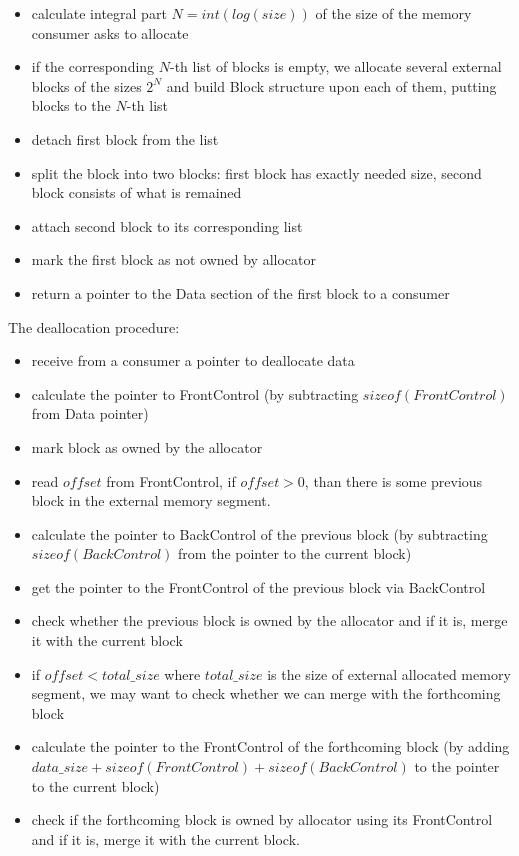 \documentclass{article}
\begin{document}
\begin{itemize}
\item calculate integral part $N = int(log(size))$ of the size of the memory consumer asks to allocate
\item if the corresponding $N$-th list of blocks is empty, we allocate several external blocks of the sizes $2^{N}$ and build Block structure upon each of them, putting blocks to the $N$-th list
\item detach first block from the list
\item split the block into two blocks: first block has exactly needed size, second block consists of what is remained
\item attach second block to its corresponding list
\item mark the first block as not owned by allocator
\item return a pointer to the Data section of the first block to a consumer
\end{itemize}

The deallocation procedure:
\begin{itemize}
\item receive from a consumer a pointer to deallocate data
\item calculate the pointer to FrontControl (by subtracting $sizeof(FrontControl)$ from Data pointer)
\item mark block as owned by the allocator
\item read $offset$ from FrontControl, if $offset > 0$, than there is some previous block in the external memory segment.
\item calculate the pointer to BackControl of the previous block (by subtracting $sizeof(BackControl)$ from the pointer to the current block)
\item get the pointer to the FrontControl of the previous block via BackControl
\item check whether the previous block is owned by the allocator and if it is, merge it with the current block
\item if $offset < total\_size$ where $total\_size$ is the size of external allocated memory segment, we may want to check whether we can merge with the forthcoming block
\item calculate the pointer to the FrontControl of the forthcoming block (by adding $data\_size + sizeof(FrontControl) + sizeof(BackControl)$ to the pointer to the current block)
\item check if the forthcoming block is owned by allocator using its FrontControl and if it is, merge it with the current block.
\end{itemize}
\newpage
\end{document}

